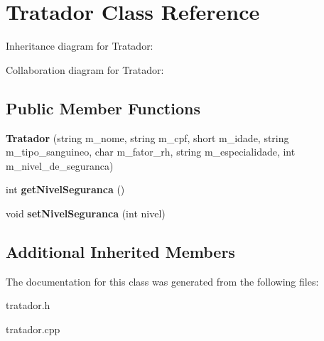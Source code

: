\hypertarget{classTratador}{}\section{Tratador Class Reference}
\label{classTratador}


Inheritance diagram for Tratador\+:


Collaboration diagram for Tratador\+:
\subsection*{Public Member Functions}
\begin{DoxyCompactItemize}
\item 
\mbox{\label{classTratador_a8ce97c2839c8c05979e44d61466f1e20}} 
{\bfseries Tratador} (string m\+\_\+nome, string m\+\_\+cpf, short m\+\_\+idade, string m\+\_\+tipo\+\_\+sanguineo, char m\+\_\+fator\+\_\+rh, string m\+\_\+especialidade, int m\+\_\+nivel\+\_\+de\+\_\+seguranca)
\item 
\mbox{\label{classTratador_aad65cccc398a703dbe1351ee322a71fe}} 
int {\bfseries get\+Nivel\+Seguranca} ()
\item 
\mbox{\label{classTratador_aa73ba2bf47efb9e3a4a233462690c121}} 
void {\bfseries set\+Nivel\+Seguranca} (int nivel)
\end{DoxyCompactItemize}
\subsection*{Additional Inherited Members}


The documentation for this class was generated from the following files\+:\begin{DoxyCompactItemize}
\item 
tratador.\+h\item 
tratador.\+cpp\end{DoxyCompactItemize}

